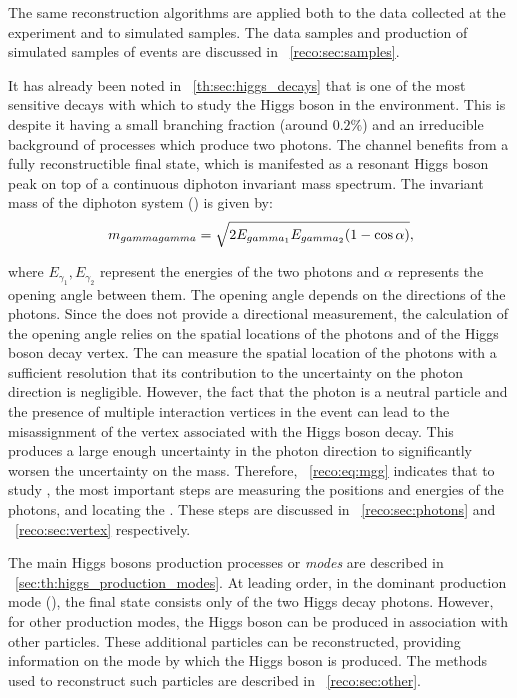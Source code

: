 The same reconstruction algorithms are applied both to the data collected at the \CMS experiment and to simulated samples. %
The data samples and production of simulated samples of \MC events are discussed in \Sec~\ref{reco:sec:samples}.


It has already been noted in \Sec~\ref{th:sec:higgs_decays} that \Hgg is one of the most sensitive decays with which to study the Higgs boson in the \LHC environment. This is despite it having a small branching fraction (around $0.2\%$) and an irreducible background of \SM processes which produce two photons. The channel benefits from a fully reconstructible final state, which is manifested as a resonant Higgs boson peak on top of a continuous diphoton invariant mass spectrum.
The invariant mass of the diphoton system (\mgg) is given by:
\begin{equation}
\label{reco:eq:mgg}
 \,m_{gammagamma} = \sqrt{2 E_{gamma_{1}} E_{gamma_{2}} (1-\cos\alpha)}, 
\end{equation}

where $E_{\gamma_{1}},E_{\gamma_{2}}$ represent the energies of the two photons and $\alpha$ represents the opening angle between them. 
The opening angle depends on the directions of the photons. Since the \CMS \ECAL does not provide a directional measurement, the calculation of the opening angle relies on the spatial locations of the photons and of the Higgs boson decay vertex. The \CMS \ECAL can measure the spatial location of the photons with a sufficient resolution that its contribution to the uncertainty on the photon direction is negligible. However, the fact that the photon is a neutral particle and the presence of multiple interaction vertices in the event can lead to the misassignment of the vertex associated with the Higgs boson decay. This produces a large enough uncertainty in the photon direction to significantly worsen the uncertainty on the mass.
Therefore, \Eq~\ref{reco:eq:mgg} indicates that to study \Hgg, the most important steps are measuring the positions and energies of the photons, and locating the \PV. These steps are discussed in \Sec~\ref{reco:sec:photons} and \Sec~\ref{reco:sec:vertex} respectively. 

The main Higgs bosons production processes or \emph{modes} are described in \Sec~\ref{sec:th:higgs_production_modes}. At leading order, in the dominant production mode (\ggH), the final state consists only of the two Higgs decay photons. However, for other production modes, the Higgs boson can be produced in association with other particles. These additional particles can be reconstructed, providing information on the mode by which the Higgs boson is produced. The methods used to reconstruct such particles are described in \Sec~\ref{reco:sec:other}.

